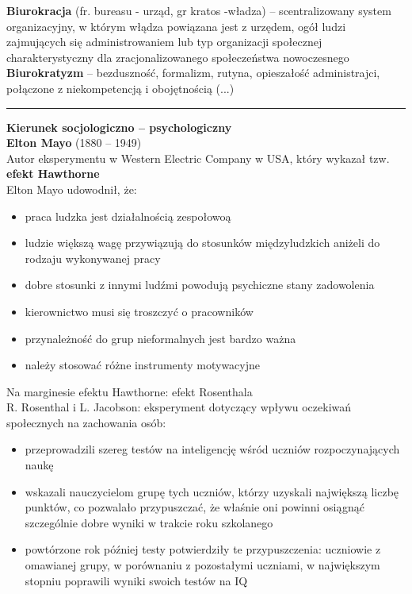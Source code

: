 \documentclass[a4paper,10pt]{report}
\begin{document}
\textbf{Biurokracja} (fr. bureasu - urząd, gr kratos -władza) -- scentralizowany system organizacyjny, w którym włądza powiązana jest z urzędem, ogół ludzi zajmujących się administrowaniem lub typ organizacji społecznej charakterystyczny dla zracjonalizowanego społeczeństwa nowoczesnego
\\ 
\textbf{Biurokratyzm} -- bezduszność, formalizm, rutyna, opieszałość administrajci, połączone z niekompetencją i obojętnością  (...)

\noindent\rule{\textwidth}{1pt}

\textbf{Kierunek socjologiczno -- psychologiczny}
\\

\textbf{Elton Mayo} (1880 -- 1949)\\
Autor eksperymentu w Western Electric Company w USA, który wykazał tzw. \textbf{efekt Hawthorne}\\

Elton Mayo udowodnił, że:
\begin{itemize}
	\item praca ludzka jest działalnością zespołowoą
	\item ludzie większą wagę przywiązują do stosunków międzyludzkich aniżeli do rodzaju wykonywanej pracy
	\item dobre stosunki z innymi ludźmi powodują psychiczne stany zadowolenia
	\item kierownictwo musi się troszczyć o pracowników
	\item przynależność do grup nieformalnych jest bardzo ważna
	\item należy stosować różne instrumenty motywacyjne
\end{itemize}

Na marginesie efektu Hawthorne: efekt Rosenthala\\
R. Rosenthal i L. Jacobson: eksperyment dotyczący wpływu oczekiwań społecznych na zachowania osób:
\begin{itemize}
	\item przeprowadzili szereg testów na inteligencję wśród uczniów rozpoczynających naukę
	\item wskazali nauczycielom grupę tych uczniów, którzy uzyskali największą liczbę punktów, co pozwalało przypuszczać, że właśnie oni powinni osiągnąć szczególnie dobre wyniki w trakcie roku szkolanego
	\item powtórzone rok później testy potwierdziły te przypuszczenia: uczniowie z omawianej grupy, w porównaniu z pozostałymi uczniami, w największym stopniu poprawili wyniki swoich testów na IQ
\end{itemize}
\end{document}
